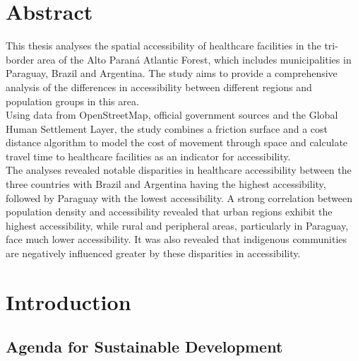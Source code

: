\documentclass[11pt, a4paper]{report}
\begin{document}
\chapter*{Abstract}

This thesis analyses the spatial accessibility of healthcare facilities in the tri-border area of the Alto Paraná Atlantic Forest, which includes municipalities in Paraguay, Brazil and Argentina. The study aims to provide a comprehensive analysis of the differences in accessibility between different regions and population groups in this area. \\
%
Using data from OpenStreetMap, official government sources and the Global Human Settlement Layer, the study combines a friction surface and a cost distance algorithm to model the cost of movement through space and calculate travel time to healthcare facilities as an indicator for accessibility.\\
%
The analyses revealed notable disparities in healthcare accessibility between the three countries with Brazil and Argentina having the highest accessibility, followed by Paraguay with the lowest accessibility. A strong correlation between population density and accessibility revealed that urban regions exhibit the highest accessibility, while rural and peripheral areas, particularly in Paraguay, face much lower accessibility. It was also revealed that indigenous communities are negatively influenced greater by these disparities in accessibility.  \\
%

\chapter{Introduction}
\section{Agenda for Sustainable Development}\label{sec:introagenda}
\end{document}
